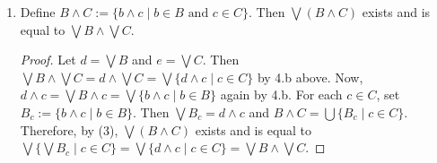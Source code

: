 \documentclass[12pt]{article}
\begin{document}
\begin{enumerate}
\begin{enumerate}
\begin{proof}
\end{proof}
\item Define $B\wedge C:=\lbrace b\wedge c\mid b\in B\mbox{ and }c\in C\rbrace.$  Then $\bigvee (B\wedge C)$ exists and is equal to $\bigvee B\wedge \bigvee C$.
\begin{proof}
Let $d=\bigvee B$ and $e=\bigvee C$.  Then $\bigvee B\wedge \bigvee C=d\wedge \bigvee C=\bigvee \lbrace d\wedge c\mid c\in C\rbrace$ by 4.b above.  Now, $d\wedge c=\bigvee B\wedge c=\bigvee \lbrace b\wedge c\mid b\in B\rbrace$ again by 4.b.  For each $c\in C$, set $B_c:=\lbrace b\wedge c\mid b\in B\rbrace$.  Then $\bigvee B_c =d\wedge c$ and $B\wedge C=\bigcup \lbrace B_c\mid c\in C\rbrace$.  Therefore, by (3), $\bigvee (B\wedge C)$ exists and is equal to $\bigvee \lbrace \bigvee B_c\mid c\in C\rbrace=\bigvee \lbrace d\wedge c\mid c\in C\rbrace=\bigvee B\wedge \bigvee C$.
\end{proof}
\end{enumerate}
\end{enumerate}
\end{document}

